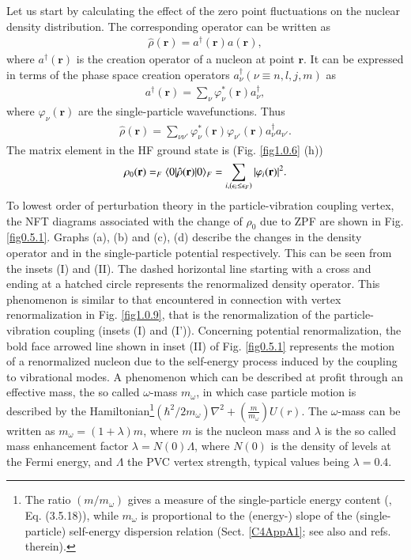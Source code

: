  Let us start by calculating the effect of the zero point fluctuations on the nuclear density distribution. The corresponding operator can be written as
\begin{align}\label{eq0.1.123}
\hat\rho(\mathbf r)=a^\dagger(\mathbf r)a(\mathbf r),
\end{align}
where $a^\dagger(\mathbf r)$ is the creation operator of a nucleon at point $\mathbf r$. It can be expressed in terms of the phase space creation operators $a^\dagger_\nu(\nu\equiv n,l,j,m)$ as
\begin{align}\label{eq0.1.124}
a^\dagger(\mathbf r)=\sum_\nu\varphi^*_\nu(\mathbf r) a^\dagger_\nu,
\end{align}
where $\varphi_\nu(\mathbf r)$ are the single-particle wavefunctions. Thus
\begin{align}\label{eq0.1.125}
\hat\rho(\mathbf r)=\sum_{\nu\nu'}\varphi^*_\nu(\mathbf r)\varphi_{\nu'}(\mathbf r)a^\dagger_\nu a_{\nu'}.
\end{align}
The matrix element in the HF ground state is (Fig. \ref{fig1.0.6} (h))
\begin{align}\label{eq0.1.126}
\rho_0(\mathbf r)=_F\langle {0|\hat\rho(\mathbf r)|0} \rangle_F=\sum_{i, (\epsilon_i\leq\epsilon_F)}|\varphi_i(\mathbf r)|^2.
\end{align}
To lowest order of perturbation theory in the particle-vibration coupling vertex, the NFT diagrams associated with the change of $\rho_0$ due to ZPF are shown in Fig. \ref{fig0.5.1}. Graphs (a),  (b) and (c), (d) describe the changes in the density operator and in the single-particle potential respectively. This can be seen from the insets (I) and (II). The dashed horizontal line starting with a cross and ending at a hatched circle represents the renormalized density operator. This phenomenon is similar to that encountered in connection with vertex renormalization in Fig. \ref{fig1.0.9}, that is the renormalization of the particle-vibration coupling (insets (I) and (I')). Concerning potential renormalization, the bold face arrowed line shown in inset (II) of Fig. \ref{fig0.5.1} represents the motion of a renormalized nucleon due to the self-energy process induced by the coupling to vibrational modes. A phenomenon which can be described at profit through an effective mass, the so called $\omega$-mass $m_\omega$, in which case particle motion is described by the Hamiltonian\footnote{The ratio $(m/m_\omega)$ gives a measure of the single-particle energy content (\cite{Mahaux:85}, Eq. (3.5.18)), while $m_\omega$ is proportional to the (energy-) slope of the (single-particle) self-energy dispersion relation (Sect. \ref{C4AppA1}; see also  \cite{Brink:05} and refs. therein).}$\left(\hbar^2/2m_\omega\right)\nabla^2+\left(\frac{m}{m_\omega}\right)U(r)$. The $\omega$-mass can be written as $m_\omega=(1+\lambda)m$, where $m$ is the nucleon mass and $\lambda$ is the so called mass enhancement factor $\lambda=N(0)\Lambda$, where $N(0)$ is the density of levels at the Fermi energy, and $\Lambda$ the PVC vertex strength, typical values being $\lambda=0.4$.


